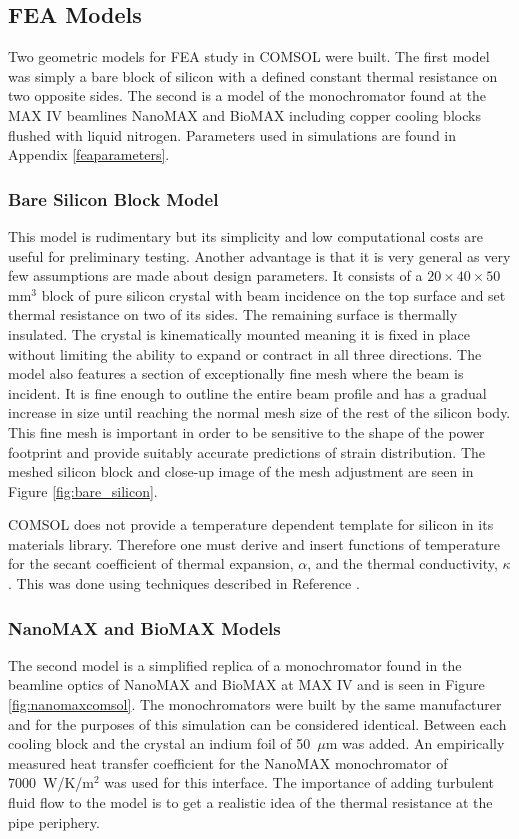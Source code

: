 \documentclass[preprint]{iucr}              %
\begin{document}
\subsection{FEA Models}

Two geometric models for FEA study in COMSOL were built. The first model was simply a bare block of silicon with a defined constant thermal resistance on two opposite sides. The second is a model of the monochromator found at the MAX IV beamlines NanoMAX and BioMAX including copper cooling blocks flushed with liquid nitrogen. Parameters used in simulations are found in Appendix \ref{feaparameters}.

\subsubsection{Bare Silicon Block Model}
This model is rudimentary but its simplicity and low computational costs are useful for preliminary testing. Another advantage is that it is very general as very few assumptions are made about design parameters. It consists of a $20\times 40\times 50~$mm$^3$ block of pure silicon crystal with beam incidence on the top surface and set thermal resistance on two of its sides. The remaining surface is thermally insulated. The crystal is kinematically mounted meaning it is fixed in place without limiting the ability to expand or contract in all three directions. The model also features a section of exceptionally fine mesh where the beam is incident. It is fine enough to outline the entire beam profile and has a gradual increase in size until reaching the normal mesh size of the rest of the silicon body. This fine mesh is important in order to be sensitive to the shape of the power footprint and provide suitably accurate predictions of strain distribution. The meshed silicon block and close-up image of the mesh adjustment are seen in Figure \ref{fig:bare_silicon}.

COMSOL does not provide a temperature dependent template for silicon in its materials library. Therefore one must derive and insert functions of temperature for the secant coefficient of thermal expansion, $\alpha$, and the thermal conductivity, $\kappa$. This was done using techniques described in Reference \cite{mash}.

\subsubsection{NanoMAX and BioMAX Models}\label{feamodels}
The second model is a simplified replica of a monochromator found in the beamline optics of NanoMAX and BioMAX at MAX IV and is seen in Figure \ref{fig:nanomaxcomsol}. The monochromators were built by the same manufacturer and for the purposes of this simulation can be considered identical. Between each cooling block and the crystal an indium foil of 50~$\mu$m was added. An empirically measured heat transfer coefficient for the NanoMAX monochromator of 7000~W/K/m$^{2}$ was used for this interface. The importance of adding turbulent fluid flow to the model is to get a realistic idea of the thermal resistance at the pipe periphery.
\end{document}
